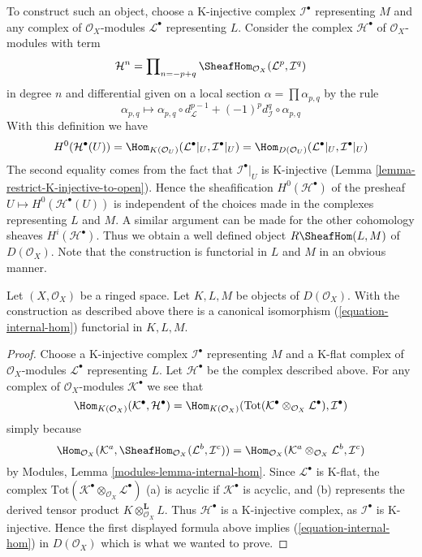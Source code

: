 \medskip\noindent
To construct such an object, choose a K-injective complex
$\mathcal{I}^\bullet$ representing
$M$ and any complex of $\mathcal{O}_X$-modules
$\mathcal{L}^\bullet$ representing $L$.
Consider the complex $\mathcal{H}^\bullet$
of $\mathcal{O}_X$-modules with term
$$
\mathcal{H}^n =
\prod\nolimits_{n = - p + q}
\SheafHom_{\mathcal{O}_X}(\mathcal{L}^p, \mathcal{I}^q)
$$
in degree $n$ and differential given on a local section
$\alpha = \prod \alpha_{p, q}$ by the rule
$$
\alpha_{p, q}
\longmapsto
\alpha_{p, q} \circ d_{\mathcal{L}}^{p - 1} +
(-1)^pd_{\mathcal{I}}^q \circ \alpha_{p, q}
$$
With this definition we have
$$
H^0(\mathcal{H}^\bullet(U)) =
\Hom_{K(\mathcal{O}_U)}(\mathcal{L}^\bullet|_U, \mathcal{I}^\bullet|_U) =
\Hom_{D(\mathcal{O}_U)}(\mathcal{L}^\bullet|_U, \mathcal{I}^\bullet|_U)
$$
The second equality comes from the fact that $\mathcal{I}^\bullet|_U$
is K-injective (Lemma \ref{lemma-restrict-K-injective-to-open}).
Hence the sheafification $H^0(\mathcal{H}^\bullet)$ of the presheaf
$U \mapsto H^0(\mathcal{H}^\bullet(U))$ is independent of the choices
made in the complexes representing $L$ and $M$. A similar argument can
be made for the other cohomology sheaves $H^i(\mathcal{H}^\bullet)$.
Thus we obtain a well
defined object $R\SheafHom(L, M)$ of $D(\mathcal{O}_X)$. Note that
the construction is functorial in $L$ and $M$ in an obvious manner.

\begin{lemma}
\label{lemma-internal-hom}
Let $(X, \mathcal{O}_X)$ be a ringed space. Let $K, L, M$ be objects
of $D(\mathcal{O}_X)$. With the construction as described above
there is a canonical isomorphism (\ref{equation-internal-hom})
functorial in $K, L, M$.
\end{lemma}

\begin{proof}
Choose a K-injective complex $\mathcal{I}^\bullet$ representing
$M$ and a K-flat complex of $\mathcal{O}_X$-modules $\mathcal{L}^\bullet$
representing $L$. Let $\mathcal{H}^\bullet$ be the complex described above.
For any complex of $\mathcal{O}_X$-modules
$\mathcal{K}^\bullet$ we see that
$$
\Hom_{K(\mathcal{O}_X)}(\mathcal{K}^\bullet, \mathcal{H}^\bullet)
=
\Hom_{K(\mathcal{O}_X)}(
\text{Tot}(\mathcal{K}^\bullet \otimes_{\mathcal{O}_X} \mathcal{L}^\bullet),
\mathcal{I}^\bullet)
$$
simply because
$$
\Hom_{\mathcal{O}_X}(
\mathcal{K}^a, \SheafHom_{\mathcal{O}_X}(\mathcal{L}^b, \mathcal{I}^c))
=
\Hom_{\mathcal{O}_X}(
\mathcal{K}^a \otimes_{\mathcal{O}_X} \mathcal{L}^b, \mathcal{I}^c)
$$
by Modules, Lemma \ref{modules-lemma-internal-hom}. Since $\mathcal{L}^\bullet$
is K-flat, the complex
$\text{Tot}(\mathcal{K}^\bullet \otimes_{\mathcal{O}_X} \mathcal{L}^\bullet)$
(a) is acyclic if $\mathcal{K}^\bullet$ is acyclic, and
(b) represents the derived tensor product
$K \otimes_{\mathcal{O}_X}^\mathbf{L} L$. Thus $\mathcal{H}^\bullet$
is a K-injective complex, as $\mathcal{I}^\bullet$ is K-injective.
Hence the first displayed formula above implies
(\ref{equation-internal-hom})
in $D(\mathcal{O}_X)$ which is what we wanted to prove.
\end{proof}

